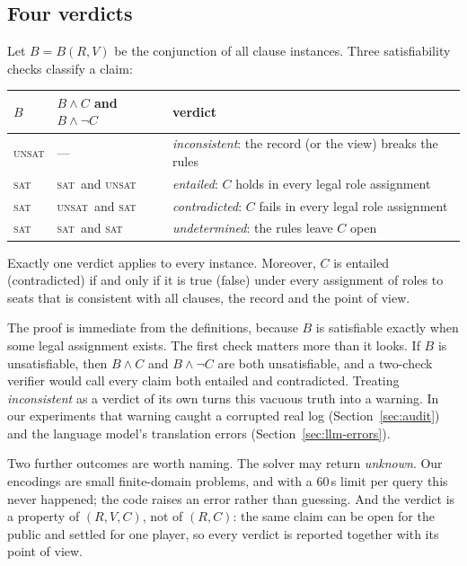 \documentclass[runningheads]{llncs}
\newcommand{\sat}{\textsc{sat}}
\newcommand{\unsat}{\textsc{unsat}}
\newcommand{\vd}[1]{\emph{#1}}             %
\begin{document}
\subsection{Four verdicts}
Let $B=B(R,V)$ be the conjunction of all clause instances. Three satisfiability checks classify a claim:
\begin{center}\small
\begin{tabular}{@{}lll@{}}
\toprule
$B$ & $B\wedge C$ and $B\wedge\neg C$ & verdict\\
\midrule
\unsat & --- & \vd{inconsistent}: the record (or the view) breaks the rules\\
\sat & \sat\ and \unsat & \vd{entailed}: $C$ holds in every legal role assignment\\
\sat & \unsat\ and \sat & \vd{contradicted}: $C$ fails in every legal role assignment\\
\sat & \sat\ and \sat & \vd{undetermined}: the rules leave $C$ open\\
\bottomrule
\end{tabular}
\end{center}
\begin{proposition}
Exactly one verdict applies to every instance. Moreover, $C$ is entailed (contradicted) if and only if it is true
(false) under every assignment of roles to seats that is consistent with all clauses, the record and the point of view.
\end{proposition}
\noindent The proof is immediate from the definitions, because $B$ is satisfiable exactly when some legal
assignment exists.
The first check matters more than it looks. If $B$ is unsatisfiable, then $B\wedge C$ and $B\wedge\neg C$ are both
unsatisfiable, and a two-check verifier would call every claim both entailed and contradicted. Treating
\vd{inconsistent} as a verdict of its own turns this vacuous truth into a warning. In our experiments that warning
caught a corrupted real log (Section~\ref{sec:audit}) and the language model's translation errors
(Section~\ref{sec:llm-errors}).

Two further outcomes are worth naming. The solver may return \emph{unknown}. Our encodings are small finite-domain
problems, and with a 60\,s limit per query this never happened; the code raises an error rather than guessing. And
the verdict is a property of $(R,V,C)$, not of $(R,C)$: the same claim can be open for the public and settled for
one player, so every verdict is reported together with its point of view.
\end{document}
